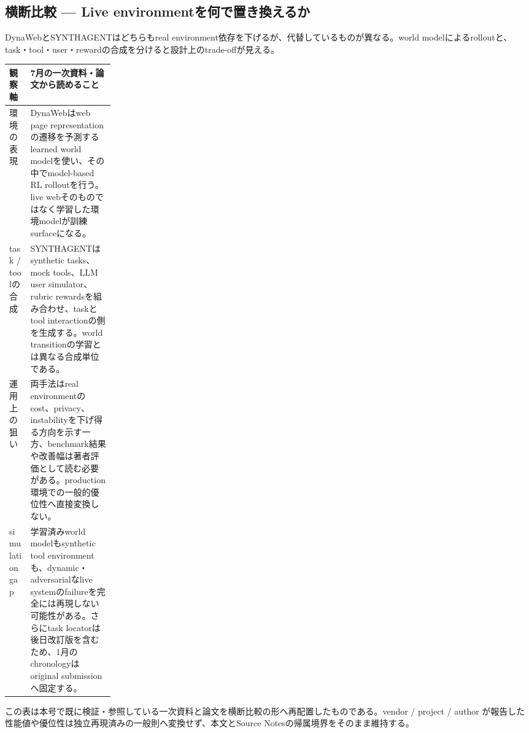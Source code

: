 \subsection*{横断比較 — Live environmentを何で置き換えるか}
DynaWebとSYNTHAGENTはどちらもreal environment依存を下げるが、代替しているものが異なる。world modelによるrolloutと、task・tool・user・rewardの合成を分けると設計上のtrade-offが見える。
\medskip
\begin{center}
\small
\renewcommand{\arraystretch}{1.16}
\begin{tabularx}{\linewidth}{@{}p{0.20\linewidth}X@{}}
\toprule
観察軸 & 7月の一次資料・論文から読めること \\
\midrule
環境の表現 & DynaWebはweb page representationの遷移を予測するlearned world modelを使い、その中でmodel-based RL rolloutを行う。live webそのものではなく学習した環境modelが訓練surfaceになる。 \cite{src-85bc3e4f7b39} \\
task / toolの合成 & SYNTHAGENTはsynthetic tasks、mock tools、LLM user simulator、rubric rewardsを組み合わせ、taskとtool interactionの側を生成する。world transitionの学習とは異なる合成単位である。 \cite{src-01d8ab4a2c6f} \\
運用上の狙い & 両手法はreal environmentのcost、privacy、instabilityを下げ得る方向を示す一方、benchmark結果や改善幅は著者評価として読む必要がある。production環境での一般的優位性へ直接変換しない。 \cite{src-85bc3e4f7b39,src-01d8ab4a2c6f} \\
simulation gap & 学習済みworld modelもsynthetic tool environmentも、dynamic・adversarialなlive systemのfailureを完全には再現しない可能性がある。さらにtask locatorは後日改訂版を含むため、1月のchronologyはoriginal submissionへ固定する。 \cite{src-85bc3e4f7b39,src-01d8ab4a2c6f} \\
\bottomrule
\end{tabularx}
\renewcommand{\arraystretch}{1.0}
\end{center}
\normalsize
\begin{claimboundary}[この比較の境界]
この表は本号で既に検証・参照している一次資料と論文を横断比較の形へ再配置したものである。vendor / project / author が報告した性能値や優位性は独立再現済みの一般則へ変換せず、本文とSource Notesの帰属境界をそのまま維持する。
\end{claimboundary}
